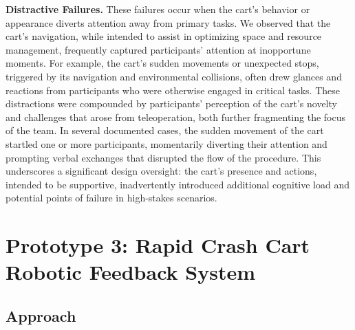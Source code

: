 \textbf{Distractive Failures.} These failures occur when the cart’s behavior or appearance diverts attention away from primary tasks. 
We observed that the cart’s navigation, while intended to assist in optimizing space and resource management, frequently captured participants’ attention at inopportune moments. 
For example, the cart's sudden movements or unexpected stops, triggered by its navigation and environmental collisions, often drew glances and reactions from participants who were otherwise engaged in critical tasks. 
These distractions were compounded by participants’ perception of the cart's novelty and challenges that arose from teleoperation, both further fragmenting the focus of the team. 
In several documented cases, the sudden movement of the cart startled one or more participants, momentarily diverting their attention and prompting verbal exchanges that disrupted the flow of the procedure. 
This underscores a significant design oversight: the cart’s presence and actions, intended to be supportive, inadvertently introduced additional cognitive load and potential points of failure in high-stakes scenarios.


\section{Prototype 3: Rapid Crash Cart Robotic Feedback System}

\subsection{Approach}

